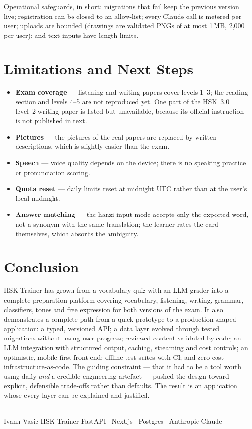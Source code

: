\documentclass[11pt,a4paper]{article}
\begin{document}
Operational safeguards, in short: migrations that fail keep the previous
version live; registration can be closed to an allow-list; every Claude call is
metered per user; uploads are bounded (drawings are validated PNGs of at most
1\,MB, 2,000 per user); and text inputs have length limits.

\section{Limitations and Next Steps}

\begin{itemize}
  \item \textbf{Exam coverage} --- listening and writing papers cover levels
        1--3; the reading section and levels 4--5 are not reproduced yet. One
        part of the HSK~3.0 level~2 writing paper is listed but unavailable,
        because its official instruction is not published in text.
  \item \textbf{Pictures} --- the pictures of the real papers are replaced by
        written descriptions, which is slightly easier than the exam.
  \item \textbf{Speech} --- voice quality depends on the device; there is no
        speaking practice or pronunciation scoring.
  \item \textbf{Quota reset} --- daily limits reset at midnight UTC rather than
        at the user's local midnight.
  \item \textbf{Answer matching} --- the hanzi-input mode accepts only the
        expected word, not a synonym with the same translation; the learner
        rates the card themselves, which absorbs the ambiguity.
\end{itemize}

\section{Conclusion}

HSK Trainer has grown from a vocabulary quiz with an LLM grader into a complete
preparation platform covering vocabulary, listening, writing, grammar,
classifiers, tones and free expression for both versions of the exam. It also
demonstrates a complete path from a quick prototype to a production-shaped
application: a typed, versioned API; a data layer evolved through tested
migrations without losing user progress; reviewed content validated by code; an
LLM integration with structured output, caching, streaming and cost controls;
an optimistic, mobile-first front end; offline test suites with CI; and
zero-cost infrastructure-as-code. The guiding constraint --- that it had to be
a tool worth using daily \emph{and} a credible engineering artefact --- pushed
the design toward explicit, defensible trade-offs rather than defaults. The
result is an application whose every layer can be explained and justified.

\vspace{1.2em}
\noindent{\color{cinnabar}\rule{\linewidth}{1pt}}\\[2pt]
{\sffamily\footnotesize\color{slate}Ivann Vasic \;\textendash\; HSK Trainer \;\textendash\;
FastAPI \textperiodcentered\ Next.js \textperiodcentered\ Postgres \textperiodcentered\ Anthropic Claude}
\end{document}

